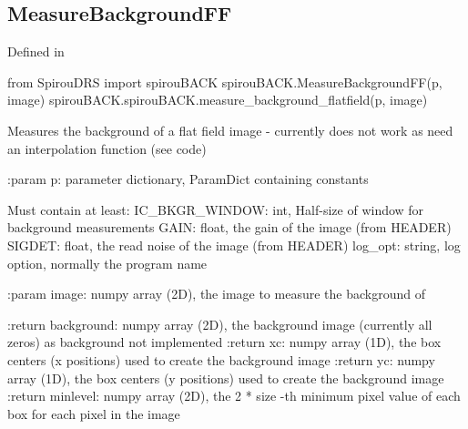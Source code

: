 \begin{minipage}{\textwidth}
\subsection{MeasureBackgroundFF}

Defined in \spirouBACK{}

\begin{pythonbox}
from SpirouDRS import spirouBACK
spirouBACK.MeasureBackgroundFF(p, image)
spirouBACK.spirouBACK.measure_background_flatfield(p, image)
\end{pythonbox}

\begin{pythondocstring}
Measures the background of a flat field image - currently does not work
as need an interpolation function (see code)

:param p: parameter dictionary, ParamDict containing constants

        Must contain at least:
            IC_BKGR_WINDOW: int, Half-size of window for background
                            measurements
            GAIN: float, the gain of the image (from HEADER)
            SIGDET: float, the read noise of the image (from HEADER)
            log_opt: string, log option, normally the program name

:param image: numpy array (2D), the image to measure the background of

:return background: numpy array (2D), the background image (currently all
                    zeros) as background not implemented
:return xc: numpy array (1D), the box centers (x positions) used to create
            the background image
:return yc: numpy array (1D), the box centers (y positions) used to create
            the background image
:return minlevel: numpy array (2D), the 2 * size -th minimum pixel value
                  of each box for each pixel in the image
\end{pythondocstring}
\end{minipage}

